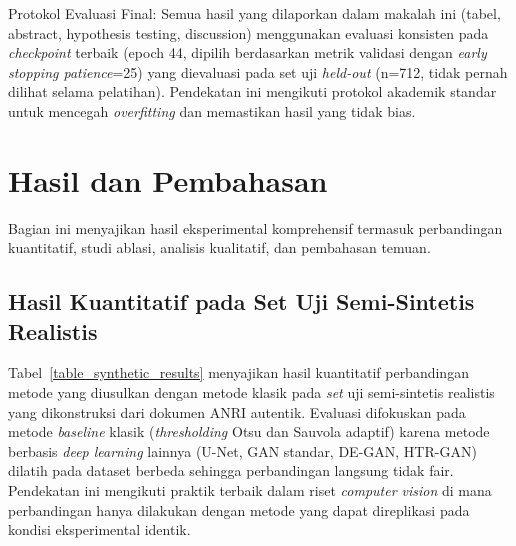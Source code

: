 \documentclass[journal]{IEEEtran}
\begin{document}
Protokol Evaluasi Final: Semua hasil yang dilaporkan dalam makalah ini (tabel, abstract, hypothesis testing, discussion) menggunakan evaluasi konsisten pada \textit{checkpoint} terbaik (epoch 44, dipilih berdasarkan metrik validasi dengan \textit{early stopping patience}=25) yang dievaluasi pada set uji \textit{held-out} (n=712, tidak pernah dilihat selama pelatihan). Pendekatan ini mengikuti protokol akademik standar untuk mencegah \textit{overfitting} dan memastikan hasil yang tidak bias.

\section{Hasil dan Pembahasan}

Bagian ini menyajikan hasil eksperimental komprehensif termasuk perbandingan kuantitatif, studi ablasi, analisis kualitatif, dan pembahasan temuan.

\subsection{Hasil Kuantitatif pada Set Uji Semi-Sintetis Realistis}

Tabel~\ref{table_synthetic_results} menyajikan hasil kuantitatif perbandingan metode yang diusulkan dengan metode klasik pada \textit{set} uji semi-sintetis realistis yang dikonstruksi dari dokumen ANRI autentik. Evaluasi difokuskan pada metode \textit{baseline} klasik (\textit{thresholding} Otsu dan Sauvola adaptif) karena metode berbasis \textit{deep learning} lainnya (U-Net, GAN standar, DE-GAN, HTR-GAN) dilatih pada dataset berbeda sehingga perbandingan langsung tidak fair. Pendekatan ini mengikuti praktik terbaik dalam riset \textit{computer vision} di mana perbandingan hanya dilakukan dengan metode yang dapat direplikasi pada kondisi eksperimental identik.
\end{document}
